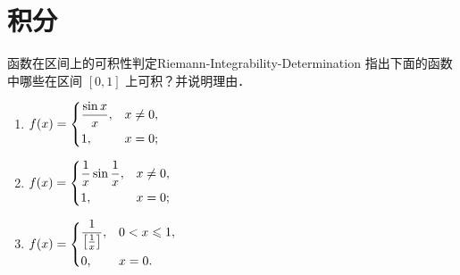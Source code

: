 \section{积分}

\begin{problem}{函数在区间上的可积性判定}{Riemann-Integrability-Determination}
    指出下面的函数中哪些在区间 $[0, 1]$ 上可积？并说明理由．
    \begin{enumerate}
        \item $f(x) = \begin{dcases} \frac{\sin x}{x}, & x \neq 0, \\ 1, & x = 0; \end{dcases}$
        \item $f(x) = \begin{dcases} \frac{1}{x} \sin \frac{1}{x}, & x \neq 0, \\ 1, & x = 0; \end{dcases}$
        \item $f(x) = \begin{dcases} \frac{1}{\left[\frac{1}{x}\right]}, & 0 < x \leqslant 1, \\ 0, & x = 0. \end{dcases}$
    \end{enumerate}
\end{problem}

